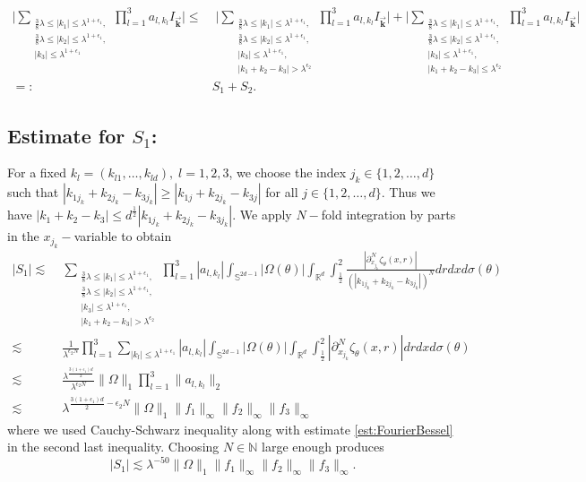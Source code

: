 \documentclass[a4paper,reqno]{amsart}
\newcommand{\R}{{\mathbb R}}       %
\newcommand{\N}{{\mathbb N}}
\newcommand{\Sp}{{\mathbb S}}
\theoremstyle{definition}
\numberwithin{equation}{section}
\begin{document}
\begin{align*}
	\Bigg|\sum_{\substack{\frac{3}{8}\lambda\leq|k_1|\leq\lambda^{1+\epsilon_1},\\\frac{3}{8}\lambda\leq|k_2|\leq\lambda^{1+\epsilon_1},\\|k_3|\leq\lambda^{1+\epsilon_1}}}\prod_{l=1}^{3}a_{l,k_l}I_{\vec{\mathbf{k}}}\Bigg|\leq&\;\Bigg|\sum_{\substack{\frac{3}{8}\lambda\leq|k_1|\leq\lambda^{1+\epsilon_1},\\\frac{3}{8}\lambda\leq|k_2|\leq\lambda^{1+\epsilon_1},\\|k_3|\leq\lambda^{1+\epsilon_1},\\|k_1+k_2-k_3|>\lambda^{\epsilon_2}}}\prod_{l=1}^{3}a_{l,k_l}I_{\vec{\mathbf{k}}}\Bigg|+\Bigg|\sum_{\substack{\frac{3}{8}\lambda\leq|k_1|\leq\lambda^{1+\epsilon_1},\\\frac{3}{8}\lambda\leq|k_2|\leq\lambda^{1+\epsilon_1},\\|k_3|\leq\lambda^{1+\epsilon_1},\\|k_1+k_2-k_3|\leq\lambda^{\epsilon_2}}}\prod_{l=1}^{3}a_{l,k_l}I_{\vec{\mathbf{k}}}\Bigg|\\
	=:\;&S_1+S_2.
\end{align*}

\subsection*{Estimate for $S_1$:} For a fixed $k_l=(k_{l1},\dots,k_{ld}),\;l=1,2,3$, we choose the index $j_k\in\{1,2,\dots,d\}$ such that $|k_{1j_k}+k_{2j_k}-k_{3j_k}|\geq|k_{1j}+k_{2j_k}-k_{3j}|$ for all $j\in\{1,2,\dots,d\}$. Thus we have $|k_1+k_2-k_3|\leq d^{\frac{1}{2}}|k_{1j_k}+k_{2j_k}-k_{3j_k}|$. We apply $N-$fold integration by parts in the $x_{j_k}-$variable to obtain
\begin{align*}
	|S_1|\lesssim\;&\sum_{\substack{\frac{3}{8}\lambda\leq|k_1|\leq\lambda^{1+\epsilon_1},\\\frac{3}{8}\lambda\leq|k_2|\leq\lambda^{1+\epsilon_1},\\|k_3|\leq\lambda^{1+\epsilon_1},\\|k_1+k_2-k_3|>\lambda^{\epsilon_2}}}\prod_{l=1}^{3}|a_{l,k_l}|\int_{\Sp^{2d-1}}|\Omega(\theta)|\int_{\R^d}\int_{\frac{1}{2}}^2\frac{|\partial_{x_{j_k}}^N\zeta_{\theta}(x,r)|}{(|k_{1j_k}+k_{2j_k}-k_{3j_k}|)^N}drdxd\sigma(\theta)\\
	\lesssim\;&\frac{1}{\lambda^{\epsilon_2N}}\prod_{l=1}^{3}\sum_{|k_l|\leq\lambda^{1+\epsilon_1}}|a_{l,k_l}|\int_{\Sp^{2d-1}}|\Omega(\theta)|\int_{\R^d}\int_{\frac{1}{2}}^2|\partial_{x_{j_k}}^N\zeta_{\theta}(x,r)|drdxd\sigma(\theta)\\
	\lesssim\;&\frac{\lambda^{\frac{3(1+\epsilon_1)d}{2}}}{\lambda^{\epsilon_2N}}\|\Omega\|_1\prod_{l=1}^{3}\|a_{l,k_l}\|_2\\
	\lesssim\;&\lambda^{\frac{3(1+\epsilon_1)d}{2}-\epsilon_2N}\|\Omega\|_1\|f_1\|_\infty\|f_2\|_\infty\|f_3\|_\infty
\end{align*}
where we used Cauchy-Schwarz inequality along with estimate \eqref{est:FourierBessel} in the second last inequality. Choosing $N\in\N$ large enough produces
\begin{equation*}
	|S_1|\lesssim\lambda^{-50}\|\Omega\|_1\|f_1\|_\infty\|f_2\|_\infty\|f_3\|_\infty.
\end{equation*}
\end{document}
